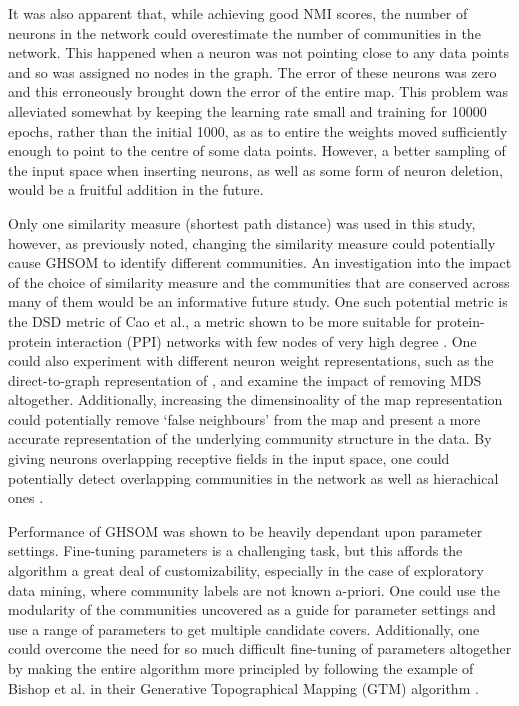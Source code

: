 \documentclass{article}
\begin{document}
It was also apparent that, while achieving good NMI scores, the number of neurons in the network could overestimate the number of communities in the network. 
This happened when a neuron was not pointing close to any data points and so was assigned no nodes in the graph.
The error of these neurons was zero and this erroneously brought down the error of the entire map.
This problem was alleviated somewhat by keeping the learning rate small and training for 10000 epochs, rather than the initial 1000, as as to entire the weights moved sufficiently enough to point to the centre of some data points. 
However, a better sampling of the input space when inserting neurons, as well as some form of neuron deletion, would be a fruitful addition in the future.

Only one similarity measure (shortest path distance) was used in this study, however, as previously noted, changing the similarity measure could potentially cause GHSOM to identify different communities. 
An investigation into the impact of the choice of similarity measure and the communities that are conserved across many of them would be an informative future study. 
One such potential metric is the DSD metric of Cao et al., a metric shown to be more suitable for protein-protein interaction (PPI) networks with few nodes of very high degree \cite{cao2013going}. 
One could also experiment with different neuron weight representations, such as the direct-to-graph representation of \cite{yamakawa2006self}, and examine the impact of removing MDS altogether.
Additionally, increasing the dimensinoality of the map representation could potentially remove `false neighbours' from the map \cite{bonabeau2002graph} and present a more accurate representation of the underlying community structure in the data. 
By giving neurons overlapping receptive fields in the input space, one could potentially detect overlapping communities in the network as well as hierachical ones \cite{lancichinetti2009detecting}.

Performance of GHSOM was shown to be heavily dependant upon parameter settings. 
Fine-tuning parameters is a challenging task, but this affords the algorithm a great deal of customizability, especially in the case of exploratory data mining, where community labels are not known a-priori.
One could use the modularity of the communities uncovered as a guide for parameter settings and use a range of parameters to get multiple candidate covers.
Additionally, one could overcome the need for so much difficult fine-tuning of parameters altogether by making the entire algorithm more principled by following the example of Bishop et al. in their Generative Topographical Mapping (GTM) algorithm \cite{bishop1996gtm}.
\end{document}
